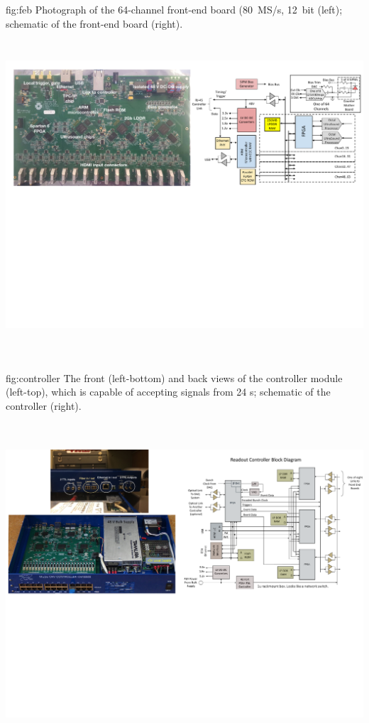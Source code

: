 \begin{dunefigure}
 {fig:feb}
 {Photograph of the 64-channel  front-end board (\SI{80}{MS/s}, \SI{12}{bit} (left); schematic of the front-end board (right).}
\includegraphics[height=4.8in]{graphics/pds-feb-tdr.pdf} 
\vspace{-6.3cm}
\end{dunefigure}

\begin{dunefigure}
 {fig:controller}
 {The front (left-bottom) and back views of the controller module (left-top), which is capable of accepting signals from 24 s; schematic of the controller (right).}
\includegraphics[height=5.0in]{graphics/pds-controller.pdf} 
\vspace{-5.5cm}
\end{dunefigure}

